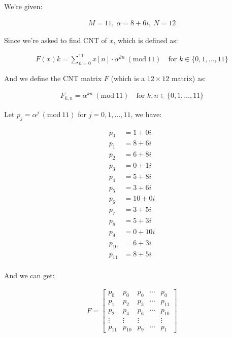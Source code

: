 \documentclass{article}
\newcommand{\modwos}[1]{\ (\mathrm{mod}\ #1)}
\begin{document}
We're given:

\begin{align*}
    M = 11, \ \alpha = 8 + 6i, \ N = 12
\end{align*}

Since we're asked to find CNT of $x$, which is defined as:

\begin{align*}
    F(x)k = \sum_{n=0}^{11} x[n] \cdot \alpha^{kn} \modwos{11} \quad \text{for } k \in \{0, 1, \dots, 11\}
\end{align*}

And we define the CNT matrix $F$ (which is a $12 \times 12$ matrix) as:

\begin{align*}
    F_{k,n} = \alpha^{kn} \modwos{11} \quad \text{for } k, n \in \{0, 1, \dots, 11\}
\end{align*}

Let $p_j = \alpha^j \modwos{11}$ for $j = 0, 1, \dots, 11$, we have:

\begin{align*}
    p_0 &= 1 + 0i \\
    p_1 &= 8 + 6i \\
    p_2 &= 6 + 8i \\
    p_3 &= 0 + 1i \\
    p_4 &= 5 + 8i \\
    p_5 &= 3 + 6i \\
    p_6 &= 10 + 0i \\
    p_7 &= 3 + 5i \\
    p_8 &= 5 + 3i \\
    p_9 &= 0 + 10i \\
    p_{10} &= 6 + 3i \\
    p_{11} &= 8 + 5i \\
\end{align*}

And we can get:

\begin{align*}
    F =
    \begin{bmatrix}
        p_0 & p_0 & p_0 & \cdots & p_0 \\
        p_1 & p_2 & p_3 & \cdots & p_{11} \\
        p_2 & p_4 & p_6 & \cdots & p_{10} \\
        \vdots & \vdots & \vdots & & \vdots \\
        p_{11} & p_{10} & p_9 & \cdots & p_1
    \end{bmatrix}
\end{align*}
\end{document}
